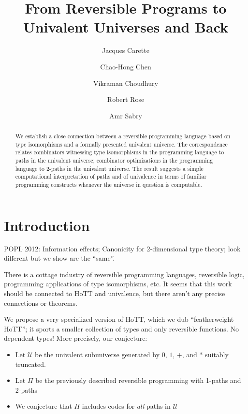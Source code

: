 \documentclass{entcs}
\begin{document}
\begin{frontmatter}
\title{From Reversible Programs to \\ Univalent Universes and Back}
\author{Jacques Carette}
\address{McMaster University}
\author{Chao-Hong Chen}
\address{Indiana University}
\author{Vikraman Choudhury}
\author{Robert Rose}
\author{Amr Sabry}
\address{Indiana University}

\begin{abstract}
  We establish a close connection between a reversible programming language
  based on type isomorphisms and a formally presented univalent universe. The
  correspondence relates combinators witnessing type isomorphisms in the
  programming language to paths in the univalent universe; combinator
  optimizations in the programming language to 2-paths in the univalent
  universe. The result suggests a simple computational interpretation of paths
  and of univalence in terms of familiar programming constructs whenever the
  universe in question is computable.
\end{abstract}

\end{frontmatter}

\section{Introduction}

POPL 2012: Information effects; Canonicity for 2-dimensional type theory; look
different but we show are the ``same''.

There is a cottage industry of reversible programming languages, reversible
logic, programming applications of type isomorphisms, etc. It seems that this
work should be connected to HoTT and univalence, but there aren't any precise
connections or theorems.

We propose a very specialized version of HoTT, which we dub
``featherweight HoTT''; it sports a smaller
collection of types and only reversible functions. No dependent types!  More
precisely, our conjecture:

\begin{itemize}
\item Let $\mathcal{U}$ be the univalent subuniverse generated by $0$, $1$, $+$,
  and $*$ suitably truncated.
\item Let $\Pi$ be the previously  described reversible programming with 1-paths and 2-paths
\item We conjecture that $\Pi$ includes codes for \emph{all} paths in $\mathcal{U}$
\end{itemize}
\end{document}
